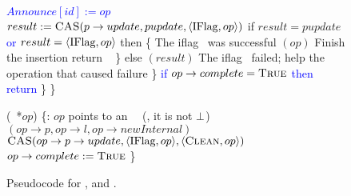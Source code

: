 \begin{figure*}
\begin{code}
		\textcolor{blue}{$Announce[id] := op$} \nlc
		$result := \mbox{\sc CAS}(p\rightarrow update, pupdate, \langle \mbox{IFlag}, op\rangle)$ \label{iflag-cas} \nlc
		if $result = pupdate$ \textcolor{blue}{or $result = \langle \mbox{IFlag},op \rangle$} then \{ \tabtabcom The iflag \CASB\ was successful\nlc
		\n            {}$(op)$ \tabtabcom Finish the insertion\label{finish-insert}\nlc
		return \TRUE\ \label{insert-true}\nlc
		\p        \}\nlc 
		else $(result)$ \tabcom The iflag \CASB\ failed; help the operation that caused failure\label{ins-help-after-failure}\nlc
		\p    \}\nlc
		\textcolor{blue}{if $op \rightarrow complete = \mbox{\sc True}$ then} \nlc
		\n		\textcolor{blue}{return \TRUE} \nlc \p
		\p\}\nlc 
		\p
		\}\bl
		\nlc
		
		(\IFlag\ *$op$) \{\ul
		\n     {}:  $op$ points to an \IFlag\ \record\  (\ie, it is not $\mbox{$\bot$}$)\nlc
		$(op\rightarrow p, op\rightarrow l, op\rightarrow newInternal)$ \label{ichild-cas}\nlc
		$\mbox{\sc CAS}(op\rightarrow p\rightarrow update, \langle \mbox{IFlag}, op \rangle, \langle \mbox{\sc Clean}, op\rangle)$  \label{iunflag-cas}\nlc
		\textcolor{blue}{$op \rightarrow complete := \mbox{\sc True}$} \nlc 
		\p
		\}
	\end{code}
	\caption{\label{code2}Pseudocode for ,  and .}
\end{figure*}

